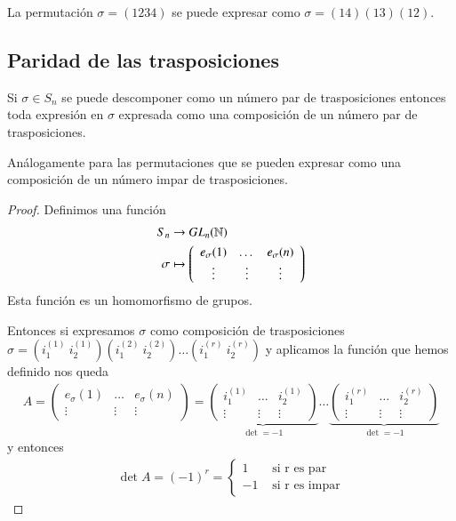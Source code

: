 \begin{ej}
	La permutación $\sigma = (1234)$ se puede expresar como $\sigma = (14)(13)(12)$.
\end{ej}

\subsection{Paridad de las trasposiciones}

\begin{thm}
	\label{thm:paridadpermutaciones}
	Si $\sigma \in S_n$ se puede descomponer como un número par de trasposiciones entonces toda expresión en $\sigma$ expresada como una composición de un número par de trasposiciones.
	
	Análogamente para las permutaciones que se pueden expresar como una composición de un número impar de trasposiciones.
\end{thm}

\begin{proof}
	Definimos una función
	\begin{align*}
		S_n &\to GL_n(\mathbb{N})\\
		\sigma &\mapsto \left(\begin{array}{ccc}
		e_\sigma(1) & \dots & e_\sigma(n) \\
		\vdots & \vdots & \vdots
		\end{array}\right)
	\end{align*}
	Esta función es un homomorfismo de grupos.
	
	Entonces si expresamos $\sigma$ como composición de trasposiciones $\sigma = (i_1^{(1)}\ i_2^{(1)})(i_1^{(2)}\ i_2^{(2)}) \dots (i_1^{(r)}\ i_2^{(r)})$ y aplicamos la función que hemos definido nos queda
	\begin{align*}
		A = \left(\begin{array}{ccc}
		e_\sigma(1) & \dots & e_\sigma(n) \\
		\vdots & \vdots & \vdots
		\end{array}\right) = \underbrace{\left(\begin{array}{ccc}
			i_1^{(1)} & \dots & i_2^{(1)} \\
			\vdots & \vdots & \vdots
			\end{array}\right)}_{\det = -1} \dots \underbrace{\left(\begin{array}{ccc}
			i_1^{(r)} & \dots & i_2^{(r)} \\
			\vdots & \vdots & \vdots
			\end{array}\right)}_{\det = -1}
	\end{align*}
	y entonces
	\begin{align*}
		\det A = (-1)^r = \begin{cases}
		1 &\text{ si r es par} \\
		-1 &\text{ si r es impar}
		\end{cases}
	\end{align*}
\end{proof}

